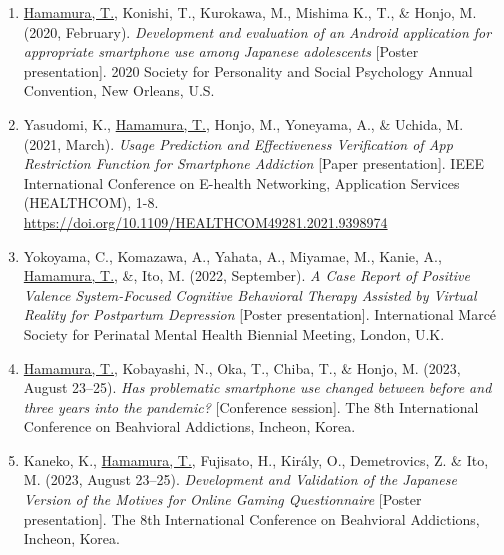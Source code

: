 \documentclass[a4paper]{article}
\begin{document}
\begin{enumerate}
	\item \underline{Hamamura, T.}, Konishi, T., Kurokawa, M., Mishima K., T., \& Honjo, M. (2020, February). \textit{Development and evaluation of an Android application for appropriate smartphone use among Japanese adolescents} [Poster presentation]. 2020 Society for Personality and Social Psychology Annual Convention, New Orleans, U.S.
	\item Yasudomi, K., \underline{Hamamura, T.}, Honjo, M., Yoneyama, A., \& Uchida, M. (2021, March). \textit{Usage Prediction and Effectiveness Verification of App Restriction Function for Smartphone Addiction} [Paper presentation]. IEEE International Conference on E-health Networking, Application Services (HEALTHCOM), 1-8. \url{https://doi.org/10.1109/HEALTHCOM49281.2021.9398974}
	\item Yokoyama, C., Komazawa, A., Yahata, A., Miyamae, M., Kanie, A., \underline{Hamamura, T.}, \&, Ito, M. (2022, September). \textit{A Case Report of Positive Valence System-Focused Cognitive Behavioral Therapy Assisted by Virtual Reality for Postpartum Depression} [Poster presentation]. International Marc\'e Society for Perinatal Mental Health Biennial Meeting, London, U.K.
	\item \underline{Hamamura, T.}, Kobayashi, N., Oka, T., Chiba, T., \& Honjo, M. (2023, August 23--25). \textit{Has problematic smartphone use changed between before and three years into the pandemic?} [Conference session]. The 8th International Conference on Beahvioral Addictions, Incheon, Korea.
	\item Kaneko, K., \underline{Hamamura, T.}, Fujisato, H., Király, O., Demetrovics, Z. \& Ito, M. (2023, August 23--25). \textit{Development and Validation of the Japanese Version of the Motives for Online Gaming Questionnaire} [Poster presentation]. The 8th International Conference on Beahvioral Addictions, Incheon, Korea.
\end{enumerate}
\end{document}

